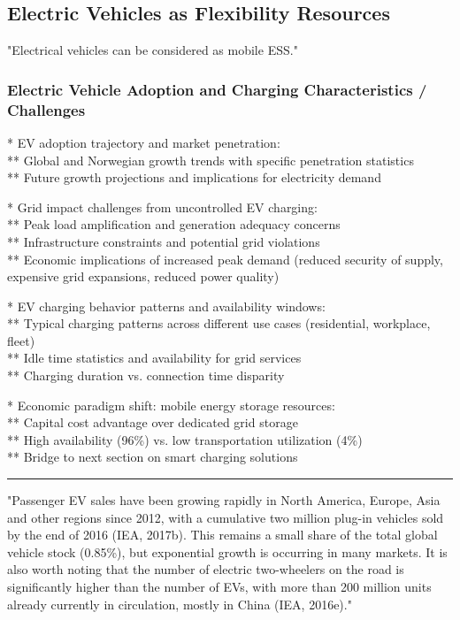 \subsection{Electric Vehicles as Flexibility Resources}

"Electrical vehicles can be considered as mobile ESS." \cite{degefa_comprehensive_2021}

\subsubsection{Electric Vehicle Adoption and Charging Characteristics / Challenges}


* EV adoption trajectory and market penetration: \\
** Global and Norwegian growth trends with specific penetration statistics \\
** Future growth projections and implications for electricity demand 

* Grid impact challenges from uncontrolled EV charging: \\
** Peak load amplification and generation adequacy concerns \\
** Infrastructure constraints and potential grid violations \\
** Economic implications of increased peak demand (reduced security of supply, expensive grid expansions, reduced power quality)

* EV charging behavior patterns and availability windows: \\
** Typical charging patterns across different use cases (residential, workplace, fleet) \\
** Idle time statistics and availability for grid services \\
** Charging duration vs. connection time disparity

* Economic paradigm shift: mobile energy storage resources: \\
** Capital cost advantage over dedicated grid storage \\
** High availability (96\%) vs. low transportation utilization (4\%) \\
** Bridge to next section on smart charging solutions

\hrule

"Passenger EV sales have been growing rapidly in North America, Europe, Asia and other regions since 2012, with a cumulative two million plug-in vehicles sold by the end of 2016 (IEA, 2017b). This remains a small share of the total global vehicle stock (0.85\%), but exponential growth is occurring in many markets. It is also worth noting that the number of electric two-wheelers on the road is significantly higher than the number of EVs, with more than 200 million units already currently in circulation, mostly in China (IEA, 2016e)." \cite{international_energy_agency_status_2017}

